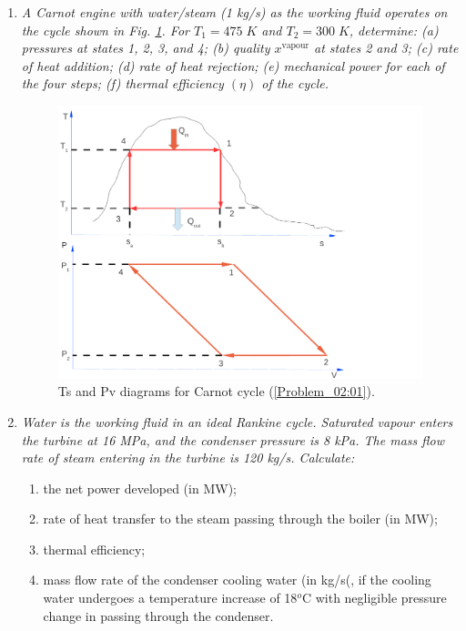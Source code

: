 \documentclass[12pts,a4paper,amsmath,amssymb,floatfix]{article}%
\begin{document}
\begin{enumerate}[label=\bfseries Problem \arabic*]
\item \label{Problem_02:01}{\it A Carnot engine with water/steam (1 kg/s) as the working fluid operates on the cycle shown in Fig. \ref{PVTSDiags}. For $T_{1}=475\;K$ and $T_{2}=300\;K$, determine: (a) pressures at states 1, 2, 3, and 4; (b) quality $x^{\text{vapour}}$ at states 2 and 3; (c) rate of heat addition; (d) rate of heat rejection; (e) mechanical power for each of the four steps; (f) thermal efficiency $\left(\eta\right)$ of the cycle.}
   \begin{figure}[h]
    \begin{center}
     \includegraphics[width=12.cm,clip]{./Pics/Carnot_PV_TS}
    \end{center}
    \caption{Ts and Pv diagrams for Carnot cycle (\ref{Problem_02:01}).}\label{PVTSDiags}
   \end{figure}    


\item {\it Water is the working fluid in an ideal Rankine cycle. Saturated vapour enters the turbine at 16 MPa, and the condenser pressure is 8 kPa. The mass flow rate of steam entering in the turbine is 120 kg/s. Calculate:
\begin{enumerate}
\item the net power developed (in MW);
\item rate of heat transfer to the steam passing through the boiler (in MW);
\item thermal efficiency;
\item mass flow rate of the condenser cooling water (in kg/s(, if the cooling water undergoes a temperature increase of 18$^{o}$C with negligible pressure change in passing through the condenser.
\end{enumerate} 
}



\end{enumerate}
\end{document}
